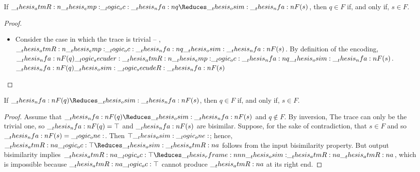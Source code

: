 %
\begin{lemma}\label{lem:final-bisim}
  If $\atmR{\emp} \oc \nfa{q} \Reduces\osim \nfa{F}(s)$, then $q \in F$ if, and only if, $s \in F$.
\end{lemma}
%
\begin{proof}
  \begin{itemize}
  \item Consider the case in which the trace is trivial -- \ie, $\__thesis_atmR:n {\__thesis_emp:} \__logic_oc: \__thesis_nfa:n {q} \__thesis_osim: \__thesis_nfa:n {F}(s)$.
    By definition of the encoding, $\__thesis_nfa:n {F}(q) \__logic_secuder: \__thesis_atmR:n {\__thesis_emp:} \__logic_oc: \__thesis_nfa:n {q} \__thesis_osim: \__thesis_nfa:n {F}(s)$.
    $\__thesis_nfa:n {F}(q) \__thesis_osim:\__logic_secudeR: \__thesis_nfa:n {F}(s)$
  \end{itemize}
\end{proof}


\begin{lemma}
  If $\nfa{F}(q) \Reduces\osim \nfa{F}(s)$, then $q \in F$ if, and only if, $s \in F$.
\end{lemma}
%
\begin{proof}
  Assume that $\nfa{F}(q) \Reduces\osim \nfa{F}(s)$ and $q \notin F$.
  By inversion, The trace can only be the trivial one, so $\__thesis_nfa:n {F}(q) = \top$ and $\__thesis_nfa:n {F}(s)$ are bisimilar.
  Suppose, for the sake of contradiction, that $s \in F$ and so $\__thesis_nfa:n {F}(s) = \__logic_one:$.
  Then $\top \__thesis_osim: \__logic_one:$; hence, $\atmR{a} \oc \top \Reduces\osim \atmR{a}$ follows from the input bisimilarity property.
  But output bisimilarity implies $\atmR{a} \oc \top \Reduces\rframe{\osim}{\atmR{a}} \atmR{a}$, which is impossible because $\__thesis_atmR:n {a} \__logic_oc: \top$ cannot produce $\__thesis_atmR:n {a}$ at its right end.
\end{proof}


